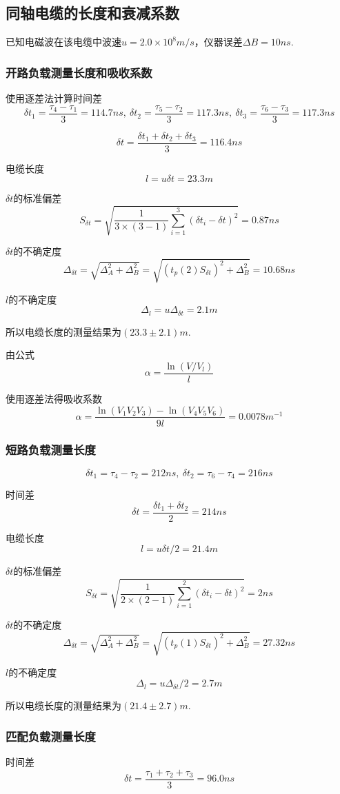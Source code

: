 \documentclass{thureport}
\begin{document}
\subsection{同轴电缆的长度和衰减系数}
已知电磁波在该电缆中波速$u=2.0\times10^8m/s$，仪器误差$\Delta B=10ns$.

\subsubsection{开路负载测量长度和吸收系数}
使用逐差法计算时间差
$$\delta t_1=\frac{\tau_4-\tau_1}{3}=114.7ns,\ \delta t_2=\frac{\tau_5-\tau_2}{3}=117.3ns,\ \delta t_3=\frac{\tau_6-\tau_3}{3}=117.3ns$$

$$\delta t=\frac{\delta t_1+\delta t_2+\delta t_3}{3}=116.4ns$$

电缆长度
$$l=u\delta t=23.3m$$

$\delta t$的标准偏差
$$S_{\delta t}=\sqrt{\frac{1}{3\times(3-1)}\sum_{i=1}^3(\delta t_i-\delta t)^2}=0.87ns$$

$\delta t$的不确定度
$$\Delta_{\delta t}=\sqrt{\Delta_A^2+\Delta_B^2}=\sqrt{(t_p(2)S_{\delta t})^2+\Delta_B^2}=10.68ns$$

$l$的不确定度
$$\Delta_l=u\Delta_{\delta t}=2.1m$$

所以电缆长度的测量结果为$(23.3\pm 2.1)m$.

由公式
$$\alpha=\frac{\ln(V/V_l)}{l}$$

使用逐差法得吸收系数
$$\alpha=\frac{\ln(V_1V_2V_3)-\ln(V_4V_5V_6)}{9l}=0.0078m^{-1}$$

\subsubsection{短路负载测量长度}
$$\delta t_1=\tau_4-\tau_2=212ns,\ \delta t_2=\tau_6-\tau_4=216ns$$

时间差
$$\delta t=\frac{\delta t_1+\delta t_2}{2}=214ns$$

电缆长度
$$l=u\delta t/2=21.4m$$

$\delta t$的标准偏差
$$S_{\delta t}=\sqrt{\frac{1}{2\times(2-1)}\sum_{i=1}^2(\delta t_i-\delta t)^2}=2ns$$

$\delta t$的不确定度
$$\Delta_{\delta t}=\sqrt{\Delta_A^2+\Delta_B^2}=\sqrt{(t_p(1)S_{\delta t})^2+\Delta_B^2}=27.32ns$$

$l$的不确定度
$$\Delta_l=u\Delta_{\delta t}/2=2.7m$$

所以电缆长度的测量结果为$(21.4\pm 2.7)m$.

\subsubsection{匹配负载测量长度}
时间差
$$\delta t=\frac{\tau_1+\tau_2+\tau_3}{3}=96.0ns$$
\end{document}
